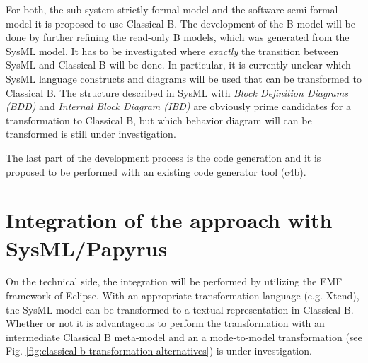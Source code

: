 For both, the sub-system strictly formal model and the software
semi-formal model it is proposed to use Classical B. The development
of the B model will be done by further refining the read-only B
models, which was generated from the SysML model. It has to be
investigated where \emph{exactly} the transition between SysML and
Classical B will be done. In particular, it is currently unclear which
SysML language constructs and diagrams will be used that can be
transformed to Classical B. The structure described in SysML with
\emph{Block Definition Diagrams (BDD)} and \emph{Internal Block
  Diagram (IBD)} are obviously prime candidates for a transformation
to Classical B, but which behavior diagram will can be transformed is
still under investigation.

The last part of the development process is the code generation and it
is proposed to be performed with an existing code generator tool
(c4b).

\section{Integration of the approach with SysML/Papyrus}

On the technical side, the integration will be performed by utilizing
the EMF framework of Eclipse. With an appropriate transformation
language (e.g. Xtend), the SysML model can be transformed to a textual
representation in Classical B. Whether or not it is advantageous to
perform the transformation with an intermediate Classical B meta-model
and an a mode-to-model transformation (see
Fig. \ref{fig:classical-b-transformation-alternatives}) is under
investigation.

